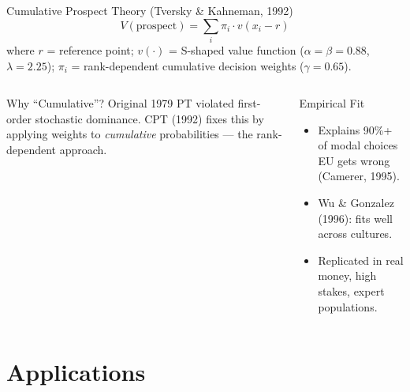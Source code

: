\documentclass[aspectratio=169]{beamer}
\begin{document}
\begin{frame}{Cumulative Prospect Theory (Tversky \& Kahneman, 1992)}
\[
  V(\text{prospect}) = \sum_{i} \pi_i \cdot v(x_i - r)
\]
where $r$ = reference point; $v(\cdot)$ = S-shaped value function ($\alpha=\beta=0.88$, $\lambda=2.25$); $\pi_i$ = rank-dependent cumulative decision weights ($\gamma=0.65$).
\begin{columns}
\begin{exampleblock}{Why ``Cumulative''?}
Original 1979 PT violated first-order stochastic dominance. CPT (1992) fixes this by applying weights to \textit{cumulative} probabilities --- the rank-dependent approach.
\end{exampleblock}
\begin{block}{Empirical Fit}
\begin{itemize}\small
  \item Explains 90\%+ of modal choices EU gets wrong (Camerer, 1995).
  \item Wu \& Gonzalez (1996): fits well across cultures.
  \item Replicated in real money, high stakes, expert populations.
\end{itemize}
\end{block}
\end{columns}
\end{frame}

\section{Applications}
\end{document}
